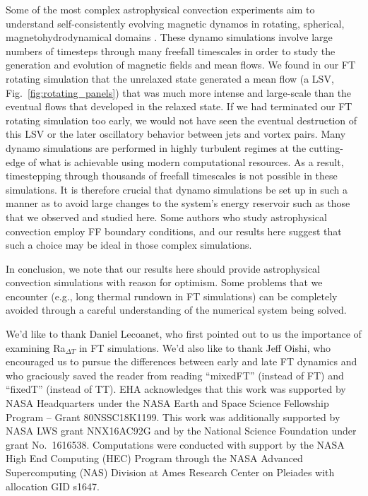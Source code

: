 \documentclass[aps, pre, onecolumn, nofootinbib, notitlepage, groupedaddress, amsfonts, amssymb, amsmath, longbibliography, superscriptaddress]{revtex4-1}
\begin{document}
Some of the most complex astrophysical convection experiments aim to understand self-consistently evolving magnetic dynamos in rotating, spherical, magnetohydrodynamical domains \cite{brown&all2010, yadav&all2016, strugarek&all2017, strugarek&all2018}.
These dynamo simulations involve large numbers of timesteps through many freefall timescales in order to study the generation and evolution of magnetic fields and mean flows.
We found in our FT rotating simulation that the unrelaxed state generated a mean flow (a LSV, Fig.~\ref{fig:rotating_panels}) that was much more intense and large-scale than the eventual flows that developed in the relaxed state.
If we had terminated our FT rotating simulation too early, we would not have seen the eventual destruction of this LSV or the later oscillatory behavior between jets and vortex pairs.
Many dynamo simulations are performed in highly turbulent regimes at the cutting-edge of what is achievable using modern computational resources.
As a result, timestepping through thousands of freefall timescales is not possible in these simulations.
It is therefore crucial that dynamo simulations be set up in such a manner as to avoid large changes to the system's energy reservoir such as those that we observed and studied here.
Some authors who study astrophysical convection \citep{featherstone&hindman2016a, strugarek&all2018, bordwell&all2018, matilsky&all2019} employ FF boundary conditions, and our results here suggest that such a choice may be ideal in those complex simulations.

In conclusion, we note that our results here should provide astrophysical convection simulations with reason for optimism.
Some problems that we encounter (e.g., long thermal rundown in FT simulations) can be completely avoided through a careful understanding of the numerical system being solved.

\begin{acknowledgments}
We'd like to thank Daniel Lecoanet, who first pointed out to us the importance of examining Ra$_{\Delta T}$ in FT simulations. 
We'd also like to thank Jeff Oishi, who encouraged us to pursue the differences between early and late FT dynamics and who graciously saved the reader from reading ``mixedFT'' (instead of FT) and ``fixedT'' (instead of TT).
EHA acknowledges that this work was supported by NASA Headquarters under the NASA Earth and Space Science Fellowship Program -- Grant 80NSSC18K1199.
This work was additionally supported by NASA LWS grant NNX16AC92G and by the National Science Foundation under grant No.~1616538. 
Computations were conducted with support by the NASA High End Computing (HEC) Program through the NASA  Advanced Supercomputing (NAS) Division at Ames Research Center on Pleiades with allocation GID s1647.
\end{acknowledgments}
\end{document}
